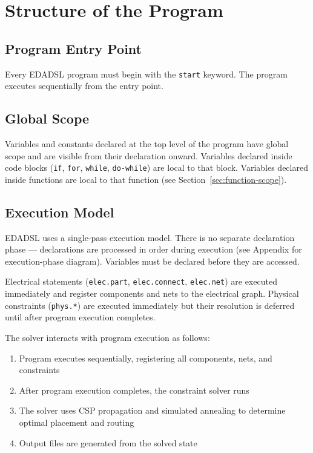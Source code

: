 \chapter{Structure of the Program}

\section{Program Entry Point}
Every EDADSL program must begin with the \texttt{start} keyword. The program executes sequentially from the entry point.

\section{Global Scope}
Variables and constants declared at the top level of the program have global scope and are visible from their declaration onward. Variables declared inside code blocks (\texttt{if}, \texttt{for}, \texttt{while}, \texttt{do-while}) are local to that block. Variables declared inside functions are local to that function (see Section~\ref{sec:function-scope}).

\section{Execution Model}
EDADSL uses a single-pass execution model. There is no separate declaration phase — declarations are processed in order during execution (see Appendix for execution-phase diagram). Variables must be declared before they are accessed.

Electrical statements (\texttt{elec.part}, \texttt{elec.connect}, \texttt{elec.net}) are executed immediately and register components and nets to the electrical graph. Physical constraints (\texttt{phys.*}) are executed immediately but their resolution is deferred until after program execution completes.

The solver interacts with program execution as follows:
\begin{enumerate}
\item Program executes sequentially, registering all components, nets, and constraints
\item After program execution completes, the constraint solver runs
\item The solver uses CSP propagation and simulated annealing to determine optimal placement and routing
\item Output files are generated from the solved state
\end{enumerate}


